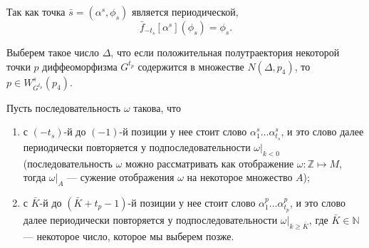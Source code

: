 \documentclass[12pt]{article}
\begin{document}
Так как точка $\bar{s}=(\alpha^s,\phi_s)$ является периодической, 
$$\bar{f}_{-t_s}[\alpha^s](\phi_s)=\phi_s.$$

Выберем такое число $\Delta$, что если положительная полутраектория некоторой точки $p$ диффеоморфизма $G^{t_p}$ содержится в множестве $N(\Delta,p_4)$, то $p\in W_{G^{t_p}}^s(p_4)$.

Пусть последовательность $\omega$ такова, что 
\begin{enumerate}
	\item с $(-t_s)$-й до $(-1)$-й позиции у нее стоит слово $\alpha^s_1\ldots\alpha^s_{t_s}$, и это слово далее периодически повторяется у подпоследовательности $\omega|_{k<0}$ (последовательность $\omega$ можно рассматривать как отображение $\omega:\mathbb{Z}\mapsto M$, тогда $\omega|_{A}$ --- сужение отображения $\omega$ на некоторое множество $A$);
	\item с $\bar{K}$-й до $(\bar{K}+t_p-1)$-й позиции у нее стоит слово $\alpha^p_1\ldots\alpha^p_{t_p}$, и это слово далее периодически повторяется у подпоследовательности $\omega|_{k\geq \bar{K}}$,
	где $\bar{K}\in\mathbb{N}$ --- некоторое число, которое мы выберем позже.
\end{enumerate}
\end{document}
